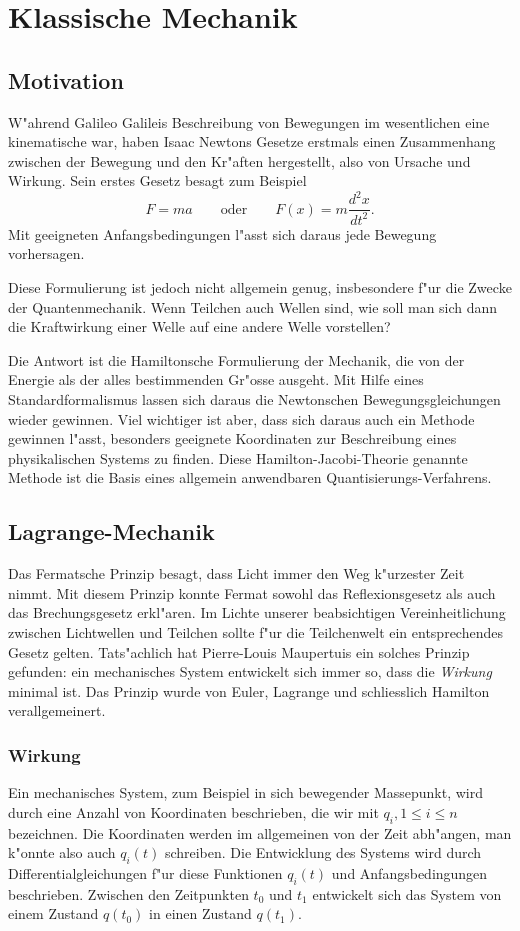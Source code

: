 \chapter{Klassische Mechanik\label{chapter:mechanik}}
\rhead{}
\section{Motivation}
W"ahrend Galileo Galileis Beschreibung von Bewegungen im wesentlichen
eine kinematische war, haben Isaac
Newtons Gesetze erstmals einen Zusammenhang zwischen
der Bewegung und den Kr"aften hergestellt, also von Ursache und
Wirkung. Sein erstes Gesetz besagt zum Beispiel
\[
F=ma\qquad\text{oder}\qquad
F(x)=m\frac{d^2x}{dt^2}.
\]
Mit geeigneten Anfangsbedingungen l"asst sich daraus jede Bewegung 
vorhersagen.

Diese Formulierung ist jedoch nicht allgemein genug, insbesondere f"ur die
Zwecke der Quantenmechanik. Wenn Teilchen auch Wellen sind, wie soll man
sich dann die Kraftwirkung einer Welle auf eine andere Welle vorstellen?

Die Antwort ist die Hamiltonsche Formulierung der Mechanik, die von der
Energie als der alles bestimmenden Gr"osse ausgeht.
Mit Hilfe eines Standardformalismus lassen sich daraus die Newtonschen
Bewegungsgleichungen wieder gewinnen.
Viel wichtiger ist aber, dass sich daraus auch ein Methode gewinnen
l"asst, besonders geeignete Koordinaten zur Beschreibung eines
physikalischen Systems zu finden.
Diese Hamilton-Jacobi-Theorie genannte Methode ist die Basis eines
allgemein anwendbaren Quantisierungs-Verfahrens.

\section{Lagrange-Mechanik}
Das Fermatsche Prinzip besagt, dass Licht immer den Weg k"urzester Zeit
nimmt. Mit diesem Prinzip konnte Fermat sowohl das Reflexionsgesetz als
auch das Brechungsgesetz erkl"aren.
Im Lichte unserer beabsichtigen Vereinheitlichung zwischen Lichtwellen
und Teilchen sollte f"ur die Teilchenwelt ein entsprechendes Gesetz
gelten. Tats"achlich hat Pierre-Louis Maupertuis ein solches Prinzip
gefunden: ein mechanisches System entwickelt sich immer so, dass die
{\em Wirkung} minimal ist. Das Prinzip wurde von Euler, Lagrange 
und schliesslich Hamilton verallgemeinert.
\subsection{Wirkung}
Ein mechanisches System, zum Beispiel in sich bewegender Massepunkt,
wird durch eine Anzahl von Koordinaten beschrieben, die wir mit
$q_i,1\le i\le n$ bezeichnen. Die Koordinaten werden im allgemeinen 
von der Zeit abh"angen, man k"onnte also auch $q_i(t)$ schreiben.
Die Entwicklung des Systems wird durch Differentialgleichungen 
f"ur diese Funktionen $q_i(t)$ und Anfangsbedingungen beschrieben.
Zwischen den Zeitpunkten $t_0$ und $t_1$ entwickelt sich das
System
von einem Zustand $q(t_0)$ in einen Zustand $q(t_1)$.

